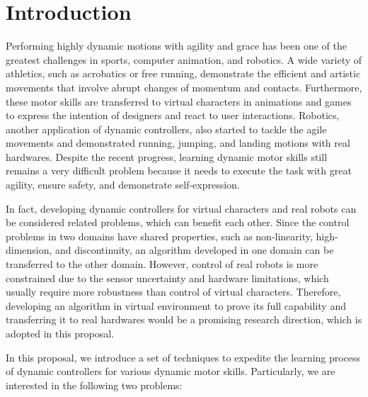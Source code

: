 \chapter{Introduction}

\indent

Performing highly dynamic motions with agility and grace has been
one of the greatest challenges in sports, computer animation, and robotics.
A wide variety of athletics, such as acrobatics or free running, demonstrate the
efficient and artistic movements that involve abrupt changes of momentum
and contacts.
Furthermore, these motor skills are transferred to virtual characters 
in animations and games to express the intention of designers
and react to user interactions.
Robotics, another application of dynamic controllers, also started 
to tackle the agile movements and demonstrated
running, jumping, and landing motions with real hardwares.
Despite the recent progress, 
learning dynamic motor skills still remains a very difficult
problem because it needs to execute the task with great agility, 
ensure safety, and demonstrate self-expression.

In fact, developing dynamic controllers for virtual characters and
real robots can be considered related problems,
which can benefit each other.
Since the control problems in two domains have shared properties,
such as non-linearity, high-dimension, and discontinuity,
an algorithm developed in one domain can be transferred 
to the other domain.
However, control of real robots is more constrained
due to the sensor uncertainty and hardware limitations, which 
usually require more robustness than control of virtual characters.
Therefore, developing an algorithm in virtual environment to prove its
full capability and transferring it to real hardwares would be
a promising research direction, which is adopted in this proposal.

In this proposal, we introduce a set of techniques to expedite
the learning process of dynamic controllers for various dynamic motor 
skills. 
Particularly, we are interested in the following two problems:


